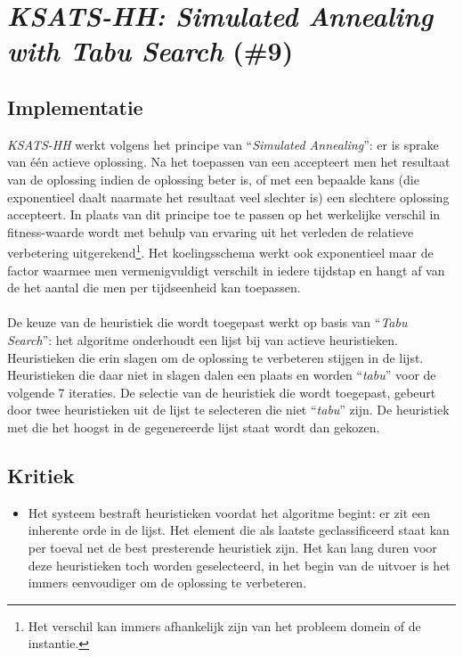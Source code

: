 \section{\emph{KSATS-HH: Simulated Annealing with Tabu Search} (\#9)}

\subsection{Implementatie}
\emph{KSATS-HH}\cite{chesc-ksats-hh} werkt volgens het principe van ``\emph{Simulated Annealing}''\cite{citeulike:1612433}: er is sprake van \'e\'en actieve oplossing. Na het toepassen van een \abllh{} accepteert men het resultaat van de oplossing indien de oplossing beter is, of met een bepaalde kans (die exponentieel daalt naarmate het resultaat veel slechter is) een slechtere oplossing accepteert. In plaats van dit principe toe te passen op het werkelijke verschil in fitness-waarde wordt met behulp van ervaring uit het verleden de relatieve verbetering uitgerekend\footnote{Het verschil kan immers afhankelijk zijn van het probleem domein of de instantie.}. Het koelingsschema werkt ook exponentieel maar de factor waarmee men vermenigvuldigt verschilt in iedere tijdstap en hangt af van de het aantal \abhn{} die men per tijdseenheid kan toepassen.
\paragraph{}
De keuze van de heuristiek die wordt toegepast werkt op basis van ``\emph{Tabu Search}''\cite{DBLP:journals/informs/Glover89}: het algoritme onderhoudt een lijst bij van actieve heuristieken. Heuristieken die erin slagen om de oplossing te verbeteren stijgen in de lijst. Heuristieken die daar niet in slagen dalen een plaats en worden ``\emph{tabu}'' voor de volgende 7 iteraties. De selectie van de heuristiek die wordt toegepast, gebeurt door twee heuristieken uit de lijst te selecteren die niet ``\emph{tabu}'' zijn. De heuristiek met die het hoogst in de gegenereerde lijst staat wordt dan gekozen.

\subsection{Kritiek}
\begin{itemize}
 \item Het systeem bestraft heuristieken voordat het algoritme begint: er zit een inherente orde in de lijst. Het element die als laatste geclassificeerd staat kan per toeval net de best presterende heuristiek zijn. Het kan lang duren voor deze heuristieken toch worden geselecteerd, in het begin van de uitvoer is het immers eenvoudiger om de oplossing te verbeteren.
\end{itemize}
